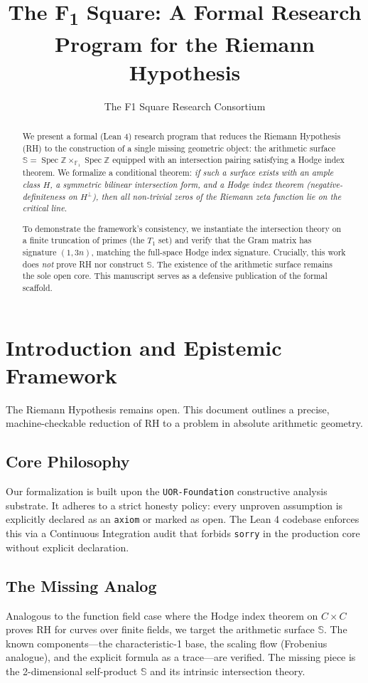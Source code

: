 \documentclass[11pt]{nyjm}
\title{The F\textsubscript{1} Square: A Formal Research Program for the Riemann Hypothesis}
\author[F1 Consortium]{The F1 Square Research Consortium}
\theoremstyle{definition}
\begin{document}
 
 
\begin{abstract}  
We present a formal (Lean 4) research program that reduces the Riemann Hypothesis (RH) to the construction of a single missing geometric object: the arithmetic surface $\mathbb{S} = \operatorname{Spec} \mathbb{Z} \times_{\mathbb{F}_1} \operatorname{Spec} \mathbb{Z}$ equipped with an intersection pairing satisfying a Hodge index theorem. We formalize a conditional theorem: \textit{if such a surface exists with an ample class $H$, a symmetric bilinear intersection form, and a Hodge index theorem (negative-definiteness on $H^\perp$), then all non-trivial zeros of the Riemann zeta function lie on the critical line.}

To demonstrate the framework's consistency, we instantiate the intersection theory on a finite truncation of primes (the $T_1$ set) and verify that the Gram matrix has signature $(1, 3n)$, matching the full-space Hodge index signature. Crucially, this work does \emph{not} prove RH nor construct $\mathbb{S}$. The existence of the arithmetic surface remains the sole open core. This manuscript serves as a defensive publication of the formal scaffold.
\end{abstract} 

\maketitle
\tableofcontents

\section{Introduction and Epistemic Framework}
The Riemann Hypothesis remains open. This document outlines a precise, machine-checkable reduction of RH to a problem in absolute arithmetic geometry.

\subsection{Core Philosophy}
Our formalization is built upon the \texttt{UOR-Foundation} constructive analysis substrate. It adheres to a strict honesty policy: every unproven assumption is explicitly declared as an \texttt{axiom} or marked as open. The Lean 4 codebase enforces this via a Continuous Integration audit that forbids \texttt{sorry} in the production core without explicit declaration.

\subsection{The Missing Analog}
Analogous to the function field case where the Hodge index theorem on $C \times C$ proves RH for curves over finite fields, we target the arithmetic surface $\mathbb{S}$. The known components—the characteristic-1 base, the scaling flow (Frobenius analogue), and the explicit formula as a trace—are verified. The missing piece is the 2-dimensional self-product $\mathbb{S}$ and its intrinsic intersection theory.
\end{document}
